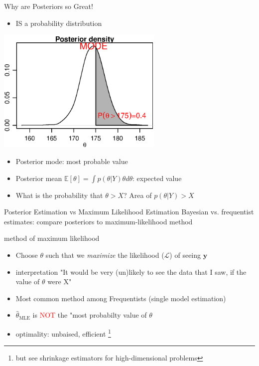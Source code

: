 \documentclass[presentation,9pt,xcolor=dvipsnames]{beamer}
\begin{document}
\begin{frame}[label={sec:org428bbff}]{Why are Posteriors so Great!}
\begin{itemize}
\item IS a probability distribution
\end{itemize}
\begin{center}
\includegraphics[width=0.6\textwidth,height=0.6\textheight]{posterior4.eps}
\end{center}
\begin{itemize}
\item Posterior mode: most probable value
\item Posterior mean \(\mathbb{E}[\theta]=\int p(\theta\vert Y)\theta d\theta\): expected value
\item What is the probability that \(\theta>X\)? Area of \(p(\theta\vert Y)>X\)
\end{itemize}
\end{frame}
\begin{frame}[label={sec:org3486118}]{Posterior Estimation vs Maximum Likelihood Estimation}
Bayesian vs. frequentist estimates: compare posteriors to maximum-likelihood method
\begin{block}{method of maximum likelihood}
\begin{itemize}
\item Choose \(\theta\) such that we \emph{maximize} the likelihood (\(\mathcal{L}\)) of seeing \(\mathbf{y}\)
\item \alert{interpretation} "It would be very (un)likely to see the data that I saw, if the value of \(\theta\) were X"
\item Most common method among Frequentists (single model estimation)
\item \(\hat{\theta}_\text{MLE}\) is \textcolor{red}{NOT} the "most probabilty value of \(\theta\)
\item \alert{optimality}: unbaised, efficient \footnote{but see shrinkage estimators for high-dimensional problems}
\end{itemize}
\end{block}
\end{frame}
\end{document}
